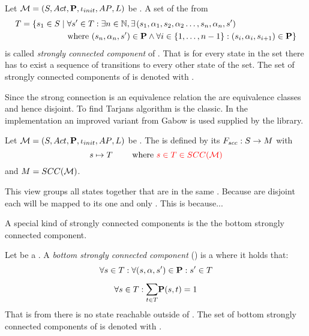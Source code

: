 \documentclass[preview]{standalone}
\begin{document}
\begin{definition}
	Let ${{{\mathcal{M}}}} = {{({S}, {Act}, {\textbf{P}}, {\iota_{init}}, {AP}, {L})}}$ be \chosengraphtypeN. A set of the from
	\begin{align*}
		{T} = \{{s}_1 \in {S} \mid & \; \forall {s}' \in {T} : \exists n \in {\mathbb{N}}, \exists \; \! ({s}_1, {\alpha}_1, {s}_2, {\alpha}_2 \dots, {s}_n, {\alpha}_n, {s}') \\
		&\text{ where } ({s}_n, {\alpha}_n, {s}') \in {\ensuremath{{\textbf{P}}}} \land \forall i \in \{1, \dots, n-1\} : ({s}_i, {\alpha}_i, {s}_{i+1}) \in {\ensuremath{{\textbf{P}}}} \}
	\end{align*}
	is called \emph{strongly connected component} of \chgph. That is for every state in the set there has to exist a sequence of transitions to every other state of the set. The set of strongly connected components of \chgph is denoted with \setscc.
\end{definition}

Since the strong connection is an equivalence relation the \sccsN are equivalence classes and hence disjoint. To find \sccsN Tarjans algorithm is the classic. In the implementation an improved variant from Gabow is used supplied by the \jgrapht library. 

\begin{definition}
	Let ${{{\mathcal{M}}}} = {{({S}, {Act}, {\textbf{P}}, {\iota_{init}}, {AP}, {L})}}$ be \chosengraphtypeN. The \viewN \viewscc is defined by its \grpfctN ${{F_{scc}}} : {S} \to {\ensuremath{{M}}}$ with
	\[
	\state \mapsto \scc \quad \quad \text{ where } \redcomment{\state \in \scc \in \setscc}
	\]
	and ${{M}} = {SCC({{{\mathcal{M}}}})}$.
\end{definition}

This view groups all states together that are in the same \sccN. Because \sccsN are disjoint each \state will be mapped to its one and only \sccN. This is because... 

A special kind of strongly connected components is the the bottom strongly connected component.

\begin{definition}
	Let \scc be a \sccN. A \emph{bottom strongly connected component} (\bsccN) is a \sccN where it holds that: 
	\[
	\forall {s} \in {T} : \forall ({s}, {\alpha}, {s}') \in {\ensuremath{{\textbf{P}}}} : {s}' \in {T}
	\]
	\[
	\forall \state \in \scc : \bigsum{t \in \scc} \trans(\state, t) = 1
	\]
	That is from \scc there is no state reachable outside of \scc. The set of bottom strongly connected components of \chgph is denoted with \setbscc.
\end{definition}
\end{document}
